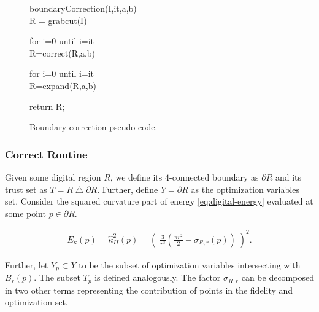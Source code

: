 \documentclass[runningheads]{llncs}
\begin{document}
\begin{figure}
\begin{tt}
boundaryCorrection(I,it,a,b)\\
\hspace{2pt} R = grabcut(I)\\
\vspace{2pt}

\hspace{2pt} for i=0 until i=it\\
\hspace{4pt} R=correct(R,a,b)\\
\vspace{2pt}

\hspace{2pt} for i=0 until i=it\\
\hspace{4pt} R=expand(R,a,b)\\
\vspace{2pt}

\hspace{2pt} return R;

\end{tt}
   \caption{Boundary correction pseudo-code.}
      \label{alg:boundary-correction}
\end{figure}

\subsubsection{Correct Routine}

Given some digital region $R$, we define its $4$-connected boundary as $\partial R$ and its trust set as $T = R \bigtriangleup \partial R$. Further, define $Y=\partial R$ as the optimization variables set. Consider the squared curvature part of energy \eqref{eq:digital-energy} evaluated at some point $p \in \partial R$.


		\begin{align}
			E_{\kappa}(p) = \hat{\kappa}_{II}^2(p)	=	\left( \; \frac{3}{r^3}\left( \frac{\pi r^2}{2} - \sigma_{R,r}(p) \right) \; \right)^2.\label{eq:correction-opt-energy-not-expanded}
		\end{align}

	
	Further, let $Y_{p} \subset Y$ to be the subset of optimization variables intersecting with $B_r(p)$. The subset $T_p$ is defined analogously. The factor $\sigma_{R,r}$ can be decomposed in two other terms representing the contribution of points in the fidelity and optimization set.
	
\end{document}
